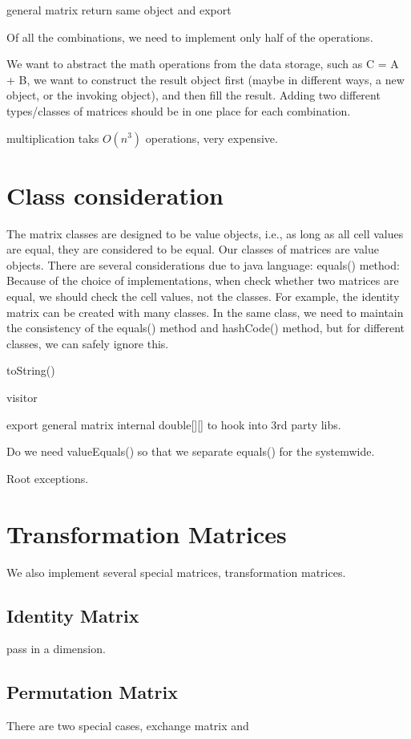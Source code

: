 general matrix return same object and export

Of all the combinations, we need to implement only half of the operations.

We want to abstract the math operations from the data storage, such as C = A + B, we want to construct the result object first (maybe in different ways, a new object, or the invoking object), and then fill the result. Adding two different types/classes of matrices should be in one place for each combination.

multiplication taks $O(n^3)$ operations, very expensive.

\section{Class consideration}
The matrix classes are designed to be value objects, i.e., as long as all cell values are equal, they are considered to be equal.
Our classes of matrices are value objects. There are several considerations due to java language:
equals() method: Because of the choice of implementations, when check whether two matrices are equal, we should check the cell values, not the classes. For example, the identity matrix can be created with many classes. In the same class, we need to maintain the consistency of the equals() method and hashCode() method, but for different classes, we can safely ignore this.

toString()

visitor

export general matrix internal double[][] to hook into 3rd party libs.


Do we need valueEquals() so that we separate equals() for the systemwide.

Root exceptions.

\section{Transformation Matrices}
We also implement several special matrices, transformation matrices.

\subsection{Identity Matrix}
pass in a dimension.

\subsection{Permutation Matrix}
There are two special cases, exchange matrix and 

